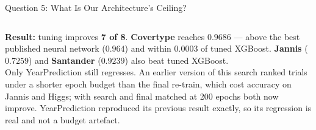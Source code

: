 \documentclass[aspectratio=169, xcolor=table]{beamer}
\begin{document}
\begin{frame}{Question 5: What Is Our Architecture's Ceiling?}
\begin{table}
\begin{tabular}{l | c | c | c | c | c}
        \end{tabular}
    \end{table}
    \vspace{-0.1cm}
    \textbf{Result:} tuning improves \textbf{7 of 8}. \textbf{Covertype} reaches $0.9686$ ---
    above the best published neural network ($0.964$) and within $0.0003$ of tuned XGBoost.
    \textbf{Jannis} ($0.7259$) and \textbf{Santander} ($0.9239$) also beat tuned XGBoost.\\[0.08cm]
    \tiny Only YearPrediction still regresses. An earlier version of this search ranked trials
    under a shorter epoch budget than the final re-train, which cost accuracy on Jannis and Higgs;
    with search and final matched at 200 epochs both now improve. YearPrediction reproduced its
    previous result exactly, so its regression is real and not a budget artefact.
\end{frame}
\end{document}
